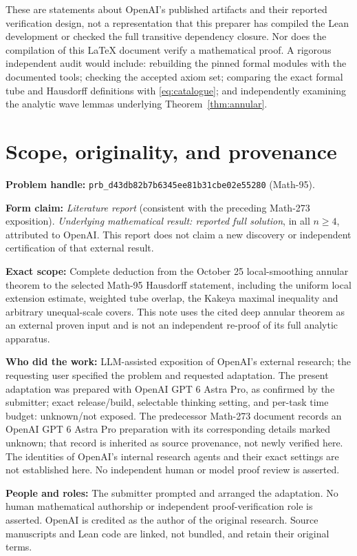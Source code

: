 \documentclass[11pt,a4paper]{article}
\numberwithin{equation}{section}
\theoremstyle{definition}
\theoremstyle{remark}
\begin{document}
These are statements about OpenAI's published artifacts and their
reported verification design, not a representation that this
preparer has compiled the Lean development or checked the full
transitive dependency closure. Nor does the compilation of this
\LaTeX{} document verify a mathematical proof. A rigorous
independent audit would include: rebuilding the pinned formal
modules with the documented tools; checking the accepted axiom set;
comparing the exact formal tube and Hausdorff definitions with
\eqref{eq:catalogue}; and independently examining the analytic wave
lemmas underlying Theorem~\ref{thm:annular}.

\section{Scope, originality, and provenance}
\label{sec:metadata}
\noindent\textbf{Problem handle:}
\texttt{prb\_d43db82b7b6345ee81b31cbe02e55280} (Math-95).

\noindent\textbf{Form claim:} \emph{Literature report} (consistent
with the preceding Math-273 exposition). \emph{Underlying mathematical
result: reported full solution}, in all $n\ge4$, attributed to OpenAI.
This report does not claim a new discovery or independent certification of that external result.

\noindent\textbf{Exact scope:} Complete deduction from the
October 25 local-smoothing annular theorem to the selected Math-95
Hausdorff statement, including the uniform local extension estimate,
weighted tube overlap, the Kakeya maximal inequality and arbitrary
unequal-scale covers. This note uses the cited deep annular theorem
as an external proven input and is not an independent re-proof of
its full analytic apparatus.

\noindent\textbf{Who did the work:} LLM-assisted exposition of
OpenAI's external research; the requesting user specified the
problem and requested adaptation. The present adaptation was
prepared with OpenAI GPT 6 Astra Pro, as confirmed by the submitter; exact release/build, selectable thinking
setting, and per-task time budget: unknown/not exposed. The
predecessor Math-273 document records an OpenAI GPT 6 Astra Pro
preparation with its corresponding details marked unknown; that
record is inherited as source provenance, not newly verified here.
The identities of OpenAI's internal research agents and their exact
settings are not established here. No independent human or model
proof review is asserted.

\noindent\textbf{People and roles:} The submitter prompted and arranged the adaptation. No human mathematical authorship or independent proof-verification role is asserted. OpenAI is credited as the author of the original research. Source manuscripts and Lean code are linked, not bundled, and retain their original terms.
\end{document}
